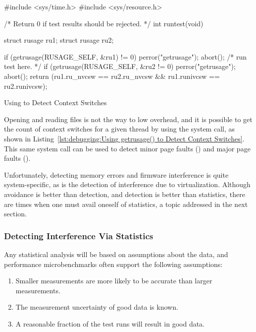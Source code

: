 \begin{listing}[tb]
\begin{linelabel}
\begin{VerbatimL}
#include <sys/time.h>
#include <sys/resource.h>

/* Return 0 if test results should be rejected. */
int runtest(void)
{
	struct rusage ru1;
	struct rusage ru2;

	if (getrusage(RUSAGE_SELF, &ru1) != 0) {
		perror("getrusage");
		abort();
	}
	/* run test here. */
	if (getrusage(RUSAGE_SELF, &ru2 != 0) {
		perror("getrusage");
		abort();
	}
	return (ru1.ru_nvcsw == ru2.ru_nvcsw &&
	        ru1.runivcsw == ru2.runivcsw);
}
\end{VerbatimL}
\end{linelabel}
\caption{Using  to Detect Context Switches}
\label{lst:debugging:Using getrusage() to Detect Context Switches}
\end{listing}

Opening and reading files is not the way to low overhead, and it is
possible to get the count of context switches for a given thread
by using the  system call, as shown in
Listing~\ref{lst:debugging:Using getrusage() to Detect Context Switches}.
This same system call can be used to detect minor page faults ()
and major page faults ().

Unfortunately, detecting memory errors and firmware interference is quite
system-specific, as is the detection of interference due to virtualization.
Although avoidance is better than detection, and detection is better than
statistics, there are times when one must avail oneself of statistics,
a topic addressed in the next section.

\subsubsection{Detecting Interference Via Statistics}
\label{sec:debugging:Detecting Interference Via Statistics}

Any statistical analysis will be based on assumptions about the data,
and performance microbenchmarks often support the following assumptions:

\begin{enumerate}
\item	Smaller measurements are more likely to be accurate than
	larger measurements.
\item	The measurement uncertainty of good data is known.
\item	A reasonable fraction of the test runs will result in good data.
\end{enumerate}

